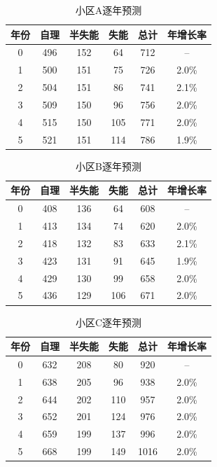 \documentclass[UTF8]{ctexart}
\begin{document}
\begin{table}[H]
\centering
\caption{小区A逐年预测}
\renewcommand{\arraystretch}{1.3}
\begin{tabular}{|c|c|c|c|c|c|}
\hline
\textbf{年份} & \textbf{自理} & \textbf{半失能} & \textbf{失能} & \textbf{总计} & \textbf{年增长率} \\
\hline
0 & 496 & 152 & 64 & 712 & -- \\
\hline
1 & 500 & 151 & 75 & 726 & 2.0\% \\
\hline
2 & 504 & 151 & 86 & 741 & 2.1\% \\
\hline
3 & 509 & 150 & 96 & 756 & 2.0\% \\
\hline
4 & 515 & 150 & 105 & 771 & 2.0\% \\
\hline
5 & 521 & 151 & 114 & 786 & 1.9\% \\
\hline
\end{tabular}
\end{table}

\begin{table}[H]
\centering
\caption{小区B逐年预测}
\renewcommand{\arraystretch}{1.3}
\begin{tabular}{|c|c|c|c|c|c|}
\hline
\textbf{年份} & \textbf{自理} & \textbf{半失能} & \textbf{失能} & \textbf{总计} & \textbf{年增长率} \\
\hline
0 & 408 & 136 & 64 & 608 & -- \\
\hline
1 & 413 & 134 & 74 & 620 & 2.0\% \\
\hline
2 & 418 & 132 & 83 & 633 & 2.1\% \\
\hline
3 & 423 & 131 & 91 & 645 & 1.9\% \\
\hline
4 & 429 & 130 & 99 & 658 & 2.0\% \\
\hline
5 & 436 & 129 & 106 & 671 & 2.0\% \\
\hline
\end{tabular}
\end{table}

\begin{table}[H]
\centering
\caption{小区C逐年预测}
\renewcommand{\arraystretch}{1.3}
\begin{tabular}{|c|c|c|c|c|c|}
\hline
\textbf{年份} & \textbf{自理} & \textbf{半失能} & \textbf{失能} & \textbf{总计} & \textbf{年增长率} \\
\hline
0 & 632 & 208 & 80 & 920 & -- \\
\hline
1 & 638 & 205 & 96 & 938 & 2.0\% \\
\hline
2 & 644 & 202 & 110 & 957 & 2.0\% \\
\hline
3 & 652 & 201 & 124 & 976 & 2.0\% \\
\hline
4 & 659 & 199 & 137 & 996 & 2.0\% \\
\hline
5 & 668 & 199 & 149 & 1016 & 2.0\% \\
\hline
\end{tabular}
\end{table}
\end{document}
